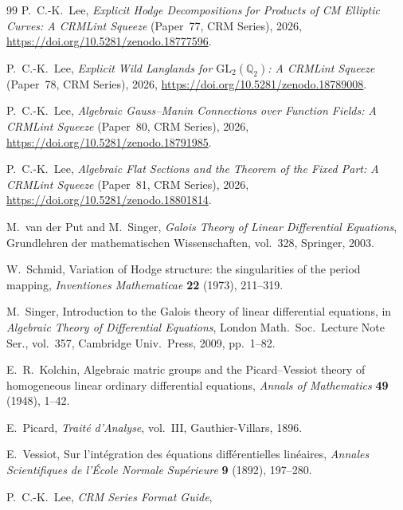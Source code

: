 \documentclass[11pt]{article}
\theoremstyle{plain}
\theoremstyle{definition}
\theoremstyle{remark}
\newcommand{\Q}{\mathbb{Q}}
\newcommand{\GL}{\mathrm{GL}}
\begin{document}
\begin{thebibliography}{99}
P.~C.-K.~Lee, \emph{Explicit Hodge Decompositions for Products of CM Elliptic Curves: A CRMLint Squeeze}
(Paper~77, CRM Series), 2026, \url{https://doi.org/10.5281/zenodo.18777596}.

P.~C.-K.~Lee, \emph{Explicit Wild Langlands for $\GL_2(\Q_2)$: A CRMLint Squeeze}
(Paper~78, CRM Series), 2026, \url{https://doi.org/10.5281/zenodo.18789008}.

P.~C.-K.~Lee, \emph{Algebraic Gauss--Manin Connections over Function Fields: A CRMLint Squeeze}
(Paper~80, CRM Series), 2026, \url{https://doi.org/10.5281/zenodo.18791985}.

P.~C.-K.~Lee, \emph{Algebraic Flat Sections and the Theorem of the Fixed Part: A CRMLint Squeeze}
(Paper~81, CRM Series), 2026, \url{https://doi.org/10.5281/zenodo.18801814}.

M.~van der Put and M.~Singer, \emph{Galois Theory of Linear Differential Equations},
Grundlehren der mathematischen Wissenschaften, vol.~328, Springer, 2003.

W.~Schmid, Variation of Hodge structure: the singularities of the period mapping,
\emph{Inventiones Mathematicae} \textbf{22} (1973), 211--319.

M.~Singer, Introduction to the Galois theory of linear differential equations,
in \emph{Algebraic Theory of Differential Equations}, London Math.\ Soc.\ Lecture Note Ser., vol.~357, Cambridge Univ.\ Press, 2009, pp.~1--82.

E.~R.~Kolchin, Algebraic matric groups and the Picard--Vessiot theory of homogeneous linear ordinary differential equations,
\emph{Annals of Mathematics} \textbf{49} (1948), 1--42.

E.~Picard, \emph{Trait\'e d'Analyse}, vol.~III, Gauthier-Villars, 1896.

E.~Vessiot, Sur l'int\'egration des \'equations diff\'erentielles lin\'eaires,
\emph{Annales Scientifiques de l'\'Ecole Normale Sup\'erieure} \textbf{9} (1892), 197--280.

P.~C.-K.~Lee, \emph{CRM Series Format Guide},

\end{thebibliography}
\end{document}
